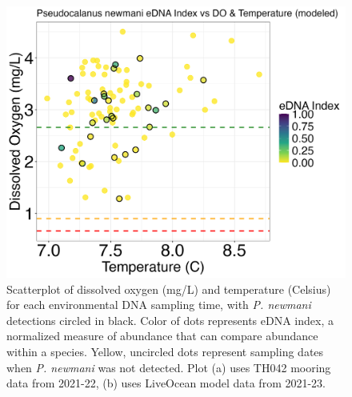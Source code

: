 \documentclass[12pt,twoside]{reedthesis}
\begin{document}
	\begin{figure}[!h]
		\begin{center}
			\includegraphics[scale=0.3]{Pnewmani_Scatter_AllYr_mod_noOut}
			\caption[\textit{P. newmani} scatterplot]{\footnotesize{Scatterplot of dissolved oxygen (mg/L) and temperature (Celsius) for each environmental DNA sampling time, with \textit{P. newmani} detections circled in black. Color of dots represents eDNA index, a normalized measure of abundance that can compare abundance within a species. Yellow, uncircled dots represent sampling dates when \textit{P. newmani} was not detected. Plot (a) uses TH042 mooring data from 2021-22, (b) uses LiveOcean model data from 2021-23.}} %
			\label{PnewmaniScatter}
		\end{center}
	\end{figure} 
	
\end{document}
